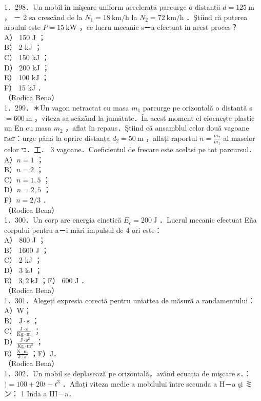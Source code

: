 \documentclass[10pt]{article}
\begin{document}
1．298．Un mobil în mişcare uniform accelerată parcurge o distantă $d=125 \mathrm{~m}$ ， － 2 sa crescând de la $N_{1}=18 \mathrm{~km} / \mathrm{h}$ la $N_{2}=72 \mathrm{~km} / \mathrm{h}$ ．Ştiind că puterea aroului este $P=15 \mathrm{~kW}$ ，ce lucru mecanic s－a efectuat in acest proces？\\
A） 150 J ；\\
B） 2 kJ ；\\
C） 150 kJ ；\\
D） 200 kJ ；\\
E） 100 kJ ；\\
F） 15 kJ ．\\
（Rodica Bena）\\
1．299．＊Un vagon netractat cu masa $m_{1}$ parcurge pe orizontală o distantă s $=600 \mathrm{~m}$ ，viteza sa scăzând la jumătate．În acest moment el ciocneşte plastic un En cu masa $m_{2}$ ，aflat în repaus．Ştiind că ansamblul celor două vagoane гæг：urge până la oprire distanța $d_{2}=50 \mathrm{~m}$ ，aflați raportul $n=\frac{m_{2}}{m_{1}}$ al maselor celor בי．工． 3 vagoane．Coeficientul de frecare este acelasi pe tot parcursul．\\
A）$n=1$ ；\\
B）$n=2$ ；\\
C）$n=1,5$ ；\\
D）$n=2,5$ ；\\
F）$n=2 / 3$ ．\\
（Rodica Bena）\\
1．300．Un corp are energia cinetică $E_{c}=200 \mathrm{~J}$ ．Lucrul mecanic efectuat Eña corpului pentru a－i mări impulsul de 4 ori este：\\
A） 800 J ；\\
B） 1600 J ；\\
C） 2 kJ ；\\
D） 3 kJ ；\\
E） $3,2 \mathrm{~kJ}$ ；F） 600 J ．\\
（Rodica Bena）\\
1．301．Alegeți expresia corectã pentru uniattea de măsură a randamentului：\\
A）W；\\
B） $\mathrm{J} \cdot \mathrm{s}$ ；\\
C）$\frac{\mathrm{J} \cdot \mathrm{s}}{\mathrm{Kg} \cdot \mathrm{m}}$ ；\\
D）$\frac{\mathrm{J} \cdot \mathrm{s}^{2}}{\mathrm{Kg} \cdot \mathrm{m}^{2}}$ ；\\
E）$\frac{\mathrm{N} \cdot \mathrm{m}}{\mathrm{J} \cdot s}$ ；F）J．\\
（Rodica Bena）\\
1．302．Un mobil se deplasează pe orizontală，având ecuația de mişcare s．：$)=100+20 t-t^{3}$ ．Aflați viteza medie a mobilului între secunda a H－a şi ミン： 1 Inda a III－a．
\end{document}
